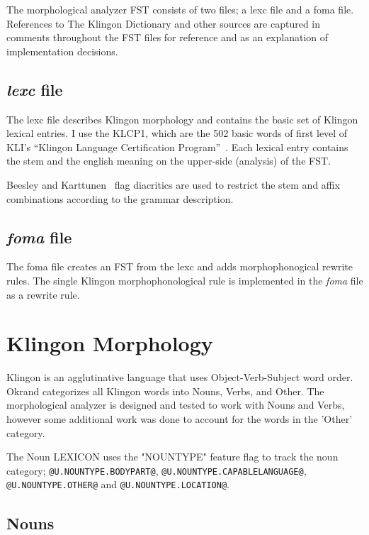 \documentclass[11pt]{article}
\begin{document}
The morphological analyzer FST consists of two files; a lexc file and a foma file. References to The Klingon Dictionary and other sources are captured in comments throughout the FST files for reference and as an explanation of implementation decisions.

\subsection{\textit{lexc} file}

The lexc file describes Klingon morphology and contains the basic set of Klingon lexical entries. I use the KLCP1, which are the 502 basic words of first level of KLI's ``Klingon Language Certification Program''~\cite{Zrajm:12}. Each lexical entry contains the stem and the english meaning on the upper-side (analysis) of the FST.

Beesley and Karttunen~ flag diacritics are used to restrict the stem and affix combinations according to the grammar description.

\subsection{\textit{foma} file}

The foma file creates an FST from the lexc and adds morphophonogical rewrite rules. The single Klingon morphophonological rule is implemented in the \textit{foma} file as a rewrite rule.

\section{Klingon Morphology}

Klingon is an agglutinative language that uses Object-Verb-Subject word order. Okrand categorizes all Klingon words into Nouns, Verbs, and Other. The morphological analyzer is designed and tested to work with Nouns and Verbs, however some additional work was done to account for the words in the 'Other' category.

The Noun LEXICON uses the "NOUNTYPE" feature flag to track the noun category; \texttt{@U.NOUNTYPE.BODYPART@}, \texttt{@U.NOUNTYPE.CAPABLELANGUAGE@}, \texttt{@U.NOUNTYPE.OTHER@} and \texttt{@U.NOUNTYPE.LOCATION@}.

\subsection {Nouns}
\end{document}
